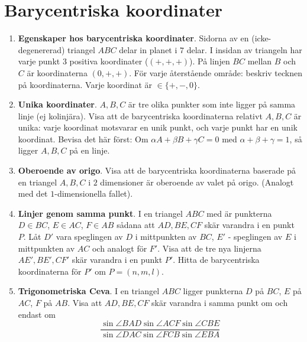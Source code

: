 

	

\section*{Barycentriska koordinater}
\begin{enumerate}


\item\textbf{Egenskaper hos barycentriska koordinater}.
	Sidorna av en (icke-degenererad) triangel $ABC$ delar in planet i $7$ delar.
	I insidan av triangeln har varje punkt $3$ positiva koordinater ($(+,+,+)$). På
	linjen $BC$ mellan $B$ och $C$ är koordinaterna $(0, +, +)$. För varje återstående område: beskriv tecknen på koordinaterna. Varje koordinat är $\in \{+,-,0\}$.

\item \textbf{Unika koordinater}.
$A,B,C$ är tre olika punkter som inte ligger på samma linje (ej kolinjära).
Visa att de barycentriska koordinaterna relativt $A,B,C$ är unika: varje koordinat
motsvarar en unik punkt, och varje punkt har en unik koordinat.
{\tiny{
        Bevisa det här först: Om $\alpha A + \beta B + \gamma C = 0$ med $\alpha + \beta + \gamma = 1$, så ligger
        $A, B, C$ på en linje. } }

\item \textbf{Oberoende av origo}. Visa att de barycentriska koordinaterna 
	baserade på en triangel $A,B,C$ i $2$ dimensioner är oberoende av valet på origo.
	(Analogt med det $1$-dimensionella fallet).

        

\item \textbf{Linjer genom samma punkt}. 
	I en triangel $ABC$ med är punkterna $D \in BC$, $E \in AC$, $F \in AB$ sådana att
	$AD, BE, CF$ skär varandra i en punkt $P$. Låt $D'$ vara speglingen av $D$ i mittpunkten av $BC$,
	$E'$ - speglingen av $E$ i mittpunkten av $AC$ och analogt för $F'$. Visa att 
	de tre nya linjerna $AE', BE', CF'$ skär varandra i en punkt $P'$. Hitta de barycentriska 
	koordinaterna för $P'$ om $P = (n, m, l)$.
	

\item \textbf{Trigonometriska Ceva}. I en triangel $ABC$ ligger punkterna
	$D$ på $BC$, $E$ på $AC$, $F$ på $AB$. Visa att $AD, BE, CF$ skär varandra
	i samma punkt om och endast om 
	\[
	\frac{\sin \angle BAD \sin \angle ACF \sin \angle CBE}
	     {\sin \angle DAC \sin \angle FCB \sin \angle EBA}
	\]


\end{enumerate}

